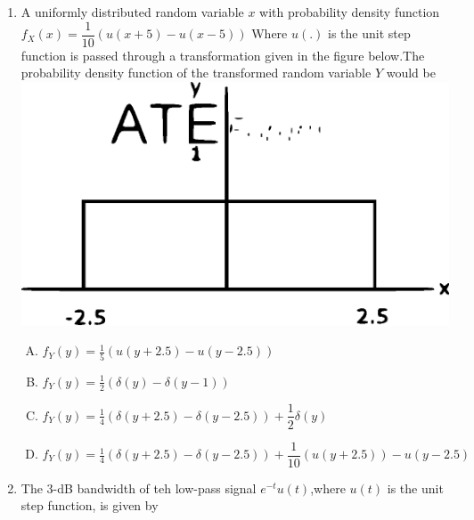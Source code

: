 \documentclass[journal,12pt,twocolumn]{IEEEtran}
\begin{document}
\begin{enumerate}[1.]
\begin{enumerate}[(A)]
\end{enumerate}

\item A uniformly distributed random variable $x$ with probability density function $f_X(x)=\dfrac{1}{10}(u(x+5)-u(x-5))$ \newline Where $u(.)$ is the unit step function is passed through a transformation given in the figure below.The probability density function of the transformed random variable $Y$ would be\\
\includegraphics[scale=0.3]{fig7.eps}

\begin{enumerate}[(A)]

\setlength\itemsep{1em}

\item $f_Y(y)=\frac{1}{5}(u(y+2.5)-u(y-2.5))$
\item $f_Y(y)=\frac{1}{2}(\delta(y)-\delta(y-1))$
\item $f_Y(y)=\frac{1}{4}(\delta(y+2.5)-\delta(y-2.5))+\dfrac{1}{2}\delta(y)$
\item $f_Y(y)=\frac{1}{4}(\delta(y+2.5)-\delta(y-2.5))+\dfrac{1}{10}(u(y+2.5))-u(y-2.5)$


\end{enumerate}

\item The 3-dB bandwidth of teh low-pass signal $e^{-t}u(t)$,where $u(t)$ is the unit step function, is given by


\end{enumerate}
\end{document}
